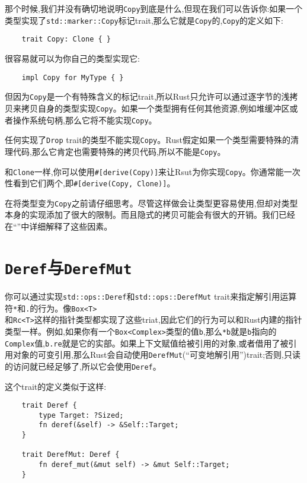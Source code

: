那个时候,我们并没有确切地说明\texttt{Copy}到底是什么,但现在我们可以告诉你:如果一个类型实现了\texttt{std::marker::Copy}标记trait,那么它就是\texttt{Copy}的,\texttt{Copy}的定义如下:
\begin{verbatim}
    trait Copy: Clone { }
\end{verbatim}

很容易就可以为你自己的类型实现它:
\begin{verbatim}
    impl Copy for MyType { }
\end{verbatim}

但因为\texttt{Copy}是一个有特殊含义的标记trait,所以Rust只允许可以通过逐字节的浅拷贝来拷贝自身的类型实现\texttt{Copy}。如果一个类型拥有任何其他资源,例如堆缓冲区或者操作系统句柄,那么它将不能实现\texttt{Copy}。

任何实现了\texttt{Drop} trait的类型不能实现\texttt{Copy}。Rust假定如果一个类型需要特殊的清理代码,那么它肯定也需要特殊的拷贝代码,所以不能是\texttt{Copy}。

和\texttt{Clone}一样,你可以使用\texttt{\#[derive(Copy)]}来让Rsut为你实现\texttt{Copy}。你通常能一次性看到它们两个,即\texttt{\#[derive(Copy, Clone)]}。

在将类型变为\texttt{Copy}之前请仔细思考。尽管这样做会让类型更容易使用,但却对类型本身的实现添加了很大的限制。而且隐式的拷贝可能会有很大的开销。我们已经在“”中详细解释了这些因素。

\section{\texttt{Deref}与\texttt{DerefMut}}\label{deref}

你可以通过实现\texttt{std::ops::Deref}和\texttt{std::ops::DerefMut} trait来指定解引用运算符\texttt{*}和\texttt{.}的行为。像\texttt{Box<T>}\\
和\texttt{Rc<T>}这样的指针类型都实现了这些triat,因此它们的行为可以和Rust内建的指针类型一样。例如,如果你有一个\texttt{Box<Complex>}类型的值\texttt{b},那么\texttt{*b}就是\texttt{b}指向的\texttt{Complex}值,\texttt{b.re}就是它的实部。如果上下文赋值给被引用的对象,或者借用了被引用对象的可变引用,那么Rust会自动使用\texttt{DerefMut}(“可变地解引用”)trait;否则,只读的访问就已经足够了,所以它会使用\texttt{Deref}。

这个trait的定义类似于这样:
\begin{verbatim}
    trait Deref {
        type Target: ?Sized;
        fn deref(&self) -> &Self::Target;
    }

    trait DerefMut: Deref {
        fn deref_mut(&mut self) -> &mut Self::Target;
    }
\end{verbatim}

